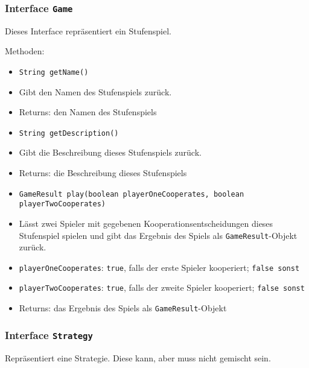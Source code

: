 \documentclass[parskip=full,11pt]{scrartcl}
\begin{document}
\subsubsection{Interface \texttt{Game}}
Dieses Interface repräsentiert ein Stufenspiel.

Methoden:
\begin{itemize}\itemsep -10pt
\item \texttt{String getName()}
\item[] Gibt den Namen des Stufenspiels zurück.
\item[] Returns: den Namen des Stufenspiels

\item \texttt{String getDescription()}
\item[] Gibt die Beschreibung dieses Stufenspiels zurück.
\item[] Returns: die Beschreibung dieses Stufenspiels

\item[] \texttt{GameResult play(boolean playerOneCooperates, boolean playerTwoCooperates)}
\item[] Lässt zwei Spieler mit gegebenen Kooperationsentscheidungen dieses Stufenspiel spielen und gibt das Ergebnis des Spiels als \texttt{GameResult}-Objekt zurück.
\item[] \texttt{playerOneCooperates}: \texttt{true}, falls der erste Spieler kooperiert; \texttt{false sonst}
\item[] \texttt{playerTwoCooperates}: \texttt{true}, falls der zweite Spieler kooperiert; \texttt{false sonst}
\item[] Returns: das Ergebnis des Spiels als \texttt{GameResult}-Objekt
\end{itemize}

\subsubsection{Interface \texttt{Strategy}}
Repräsentiert eine Strategie. Diese kann, aber muss nicht gemischt sein.
\end{document}
